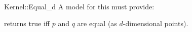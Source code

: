 \begin{ccRefFunctionObjectConcept}{Kernel::Equal_d}
A model for this must provide:


 {returns true iff $p$ and $q$ are equal (as
  $d$-dimensional points). }

\end{ccRefFunctionObjectConcept}

